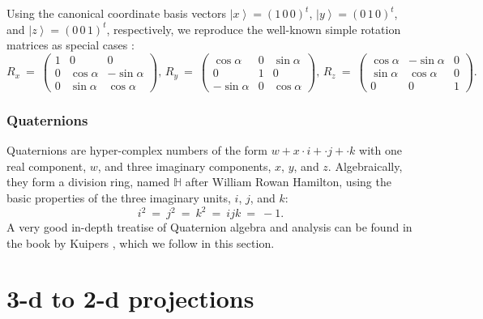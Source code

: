 Using the canonical coordinate basis vectors $\left| x \right> = \left( 1\,0\,0 \right)^t$, $\left| y \right> = \left( 0\,1\,0 \right)^t$,
and $\left| z \right> = \left( 0\,0\,1 \right)^t$, respectively, we reproduce the well-known simple rotation matrices as 
special cases \cite{TODO}:
\begin{equation}
	R_x \ =\ 
		\left( \begin{array}{ccc} 
			1 &            0 &            0  \\
			0 &  \cos \alpha & -\sin \alpha  \\
			0 & \sin \alpha  &  \cos \alpha
		\end{array} \right),\,
	R_y \ =\ 
		\left( \begin{array}{ccc} 
			  \cos \alpha &         0 &  \sin \alpha \\
			           0  &         1 &            0 \\
			-\sin \alpha  &         0 &  \cos \alpha
		\end{array} \right),\,
	R_z \ =\ 
		\left( \begin{array}{ccc} 
			 \cos \alpha & -\sin \alpha &             0  \\
			\sin \alpha  &  \cos \alpha &             0  \\
			           0 &            0 &             1
		\end{array} \right).
\end{equation}


\subsubsection{Quaternions}
Quaternions are hyper-complex numbers of the form $w + x \cdot i + \cdot j + \cdot k$ with one real component, $w$, 
and three imaginary components, $x$, $y$, and $z$. 
Algebraically, they form a division ring, named $\mathbb{H}$ after William Rowan Hamilton, using the basic 
properties of the three imaginary units, $i$, $j$, and $k$:
\begin{equation}
	i^2 \ =\ j^2 \ =\ k^2 \ =\ ijk \ =\ -1.
\end{equation}
A very good in-depth treatise of Quaternion algebra and analysis can be found in the book by Kuipers \cite{Kuipers2002}, 
which we follow in this section.


\section{3-d to 2-d projections}


